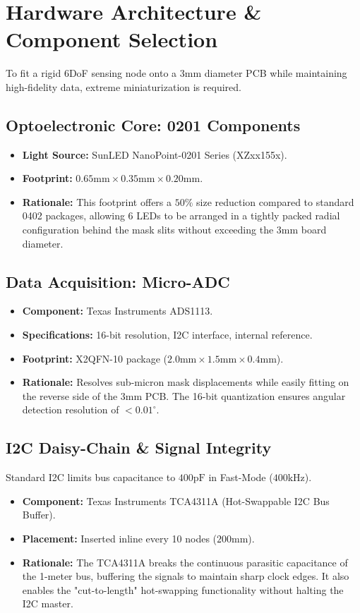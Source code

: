 \documentclass[11pt]{article}
\begin{document}
\section{Hardware Architecture \& Component Selection}
To fit a rigid 6DoF sensing node onto a 3mm diameter PCB while maintaining high-fidelity data, extreme miniaturization is required.

\subsection{Optoelectronic Core: 0201 Components}
\begin{itemize}
    \item \textbf{Light Source:} SunLED NanoPoint-0201 Series (XZxx155x).
    \item \textbf{Footprint:} $0.65\text{mm} \times 0.35\text{mm} \times 0.20\text{mm}$.
    \item \textbf{Rationale:} This footprint offers a $50\%$ size reduction compared to standard 0402 packages, allowing 6 LEDs to be arranged in a tightly packed radial configuration behind the mask slits without exceeding the 3mm board diameter.
\end{itemize}

\subsection{Data Acquisition: Micro-ADC}
\begin{itemize}
    \item \textbf{Component:} Texas Instruments ADS1113.
    \item \textbf{Specifications:} 16-bit resolution, I2C interface, internal reference.
    \item \textbf{Footprint:} X2QFN-10 package ($2.0\text{mm} \times 1.5\text{mm} \times 0.4\text{mm}$).
    \item \textbf{Rationale:} Resolves sub-micron mask displacements while easily fitting on the reverse side of the 3mm PCB. The 16-bit quantization ensures angular detection resolution of $<0.01^\circ$.
\end{itemize}

\subsection{I2C Daisy-Chain \& Signal Integrity}
Standard I2C limits bus capacitance to $400\text{pF}$ in Fast-Mode ($400\text{kHz}$). 
\begin{itemize}
    \item \textbf{Component:} Texas Instruments TCA4311A (Hot-Swappable I2C Bus Buffer).
    \item \textbf{Placement:} Inserted inline every 10 nodes ($200\text{mm}$).
    \item \textbf{Rationale:} The TCA4311A breaks the continuous parasitic capacitance of the 1-meter bus, buffering the signals to maintain sharp clock edges. It also enables the "cut-to-length" hot-swapping functionality without halting the I2C master.
\end{itemize}
\end{document}
